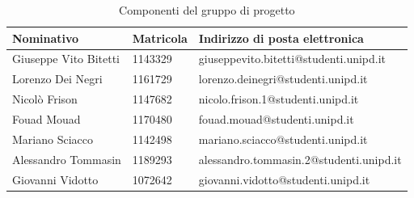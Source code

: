 			\begin{table}[H]
				\centering
				\begin{tabular}{|l|l|l|}
					\hline
					\textbf{Nominativo} & \textbf{Matricola} & \textbf{Indirizzo di posta elettronica} \\ \hline
					Giuseppe Vito Bitetti & 1143329 & giuseppevito.bitetti@studenti.unipd.it \\ \hline
					Lorenzo Dei Negri & 1161729 & lorenzo.deinegri@studenti.unipd.it \\ \hline
					Nicolò Frison & 1147682 & nicolo.frison.1@studenti.unipd.it \\ \hline
					Fouad Mouad & 1170480 & fouad.mouad@studenti.unipd.it \\ \hline
					Mariano Sciacco & 1142498 & mariano.sciacco@studenti.unipd.it \\ \hline
					Alessandro Tommasin & 1189293 & alessandro.tommasin.2@studenti.unipd.it \\ \hline
					Giovanni Vidotto & 1072642 & giovanni.vidotto@studenti.unipd.it \\ \hline
				\end{tabular}
				\caption{Componenti del gruppo di progetto}
			\end{table}
		
